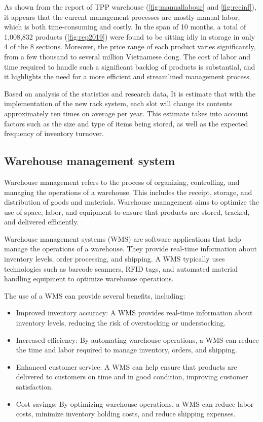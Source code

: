 As shown from the report of TPP warehouse (\autoref{fig:manuallabour} and \ref{fig:recinf}), it appears that the current management processes are mostly manual labor, which is both time-consuming and costly. In the span of 10 months, a total of 1,008,832 products (\autoref{fig:rep2019}) were found to be sitting idly in storage in only 4 of the 8 sections. Moreover, the price range of each product varies significantly, from a few thousand to several million Vietnamese dong. The cost of labor and time required to handle such a significant backlog of products is substantial, and it highlights the need for a more efficient and streamlined management process.

Based on analysis of the statistics and research data, It is estimate that with the implementation of the new rack system, each slot will change its contents approximately ten times on average per year. This estimate takes into account factors such as the size and type of items being stored, as well as the expected frequency of inventory turnover. \cite{tienphongplastic}

\subsection{Warehouse management system}

Warehouse management refers to the process of organizing, controlling, and managing the operations of a warehouse. This includes the receipt, storage, and distribution of goods and materials. Warehouse management aims to optimize the use of space, labor, and equipment to ensure that products are stored, tracked, and delivered efficiently. \cite{Kumar2019}

Warehouse management systems (WMS) are software applications that help manage the operations of a warehouse. They provide real-time information about inventory levels, order processing, and shipping. A WMS typically uses technologies such as barcode scanners, RFID tags, and automated material handling equipment to optimize warehouse operations.  \cite{Kumar2019}

The use of a WMS can provide several benefits, including:
\begin{itemize}
    \begin{itemize}
        \item Improved inventory accuracy: A WMS provides real-time information about inventory levels, reducing the risk of overstocking or understocking.
        \item Increased efficiency: By automating warehouse operations, a WMS can reduce the time and labor required to manage inventory, orders, and shipping.
        \item Enhanced customer service: A WMS can help ensure that products are delivered to customers on time and in good condition, improving customer satisfaction.
        \item Cost savings: By optimizing warehouse operations, a WMS can reduce labor costs, minimize inventory holding costs, and reduce shipping expenses.
    \end{itemize}
\end{itemize}

